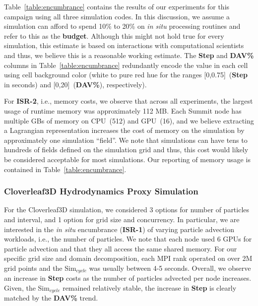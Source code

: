 %
Table~\ref{table:encumbrance} contains the results of our experiments for this campaign using all three simulation codes.
%
In this discussion, we assume a simulation can afford to spend 10\% to 20\% on \textit{in situ} processing routines and refer to this as the \textbf{budget}. 
%
Although this might not hold true for every simulation, this estimate is based on interactions with computational scientists and thus, we believe this is a reasonable working estimate.
%
The \textbf{Step} and \textbf{DAV\%} columns in Table~\ref{table:encumbrance} redundantly encode the value in each cell using cell background color (white to pure red hue for the ranges [0,0.75]~(\textbf{Step} in seconds) and [0,20]~(\textbf{DAV\%}), respectively).
%

For \textbf{ISR-2}, i.e., memory costs, we observe that across all experiments, the largest usage of runtime memory was approximately 112 MB.
%
Each Summit node has multiple GBs of memory on CPU~(512) and GPU~(16), and we believe extracting a Lagrangian representation increases the cost of memory on the simulation by approximately one simulation ``field''.
%
We note that simulations can have tens to hundreds of fields defined on the simulation grid and thus, this cost would likely be considered acceptable for most simulations.
%
Our reporting of memory usage is contained in Table~\ref{table:encumbrance}.

\subsubsection{Cloverleaf3D Hydrodynamics Proxy Simulation}
For the Cloverleaf3D simulation, we considered 3 options for number of particles and interval, and 1 option for grid size and concurrency.
%
In particular, we are interested in the \textit{in situ} encumbrance (\textbf{ISR-1}) of varying particle advection workloads, i.e., the number of particles. 
%
We note that each node used 6 GPUs for particle advection and that they all access the same shared memory.
%
For our specific grid size and domain decomposition, each MPI rank operated on over 2M grid points and the Sim$_{cycle}$ was usually between 4-5 seconds. 
%
Overall, we observe an increase in \textbf{Step} costs as the number of particles advected per node increases.
%
Given, the Sim$_{cycle}$ remained relatively stable, the increase in \textbf{Step} is clearly matched by the \textbf{DAV\%} trend.
%

